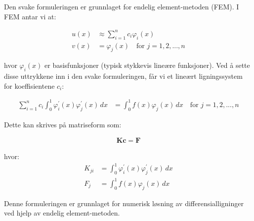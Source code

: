 Den svake formuleringen er grunnlaget for endelig element-metoden (FEM).
I FEM antar vi at:

\begin{align*}
    u(x) & \approx \sum_{i=1}^n c_i \varphi_i(x)        \\
    v(x) & = \varphi_j(x) \quad \text{for } j=1,2,...,n
\end{align*}

hvor $\varphi_i(x)$ er basisfunksjoner (typisk stykkevis lineære funksjoner). Ved å sette disse uttrykkene inn i den svake formuleringen, får vi et lineært ligningssystem for koeffisientene $c_i$:

\begin{align*}
    \sum_{i=1}^n c_i \int_0^1 \varphi_i^{\prime}(x) \varphi_j^{\prime}(x) \, dx & = \int_0^1 f(x) \varphi_j(x) \, dx \quad \text{for } j=1,2,...,n
\end{align*}

Dette kan skrives på matriseform som:

\begin{align*}
    \mathbf{K} \mathbf{c} = \mathbf{F}
\end{align*}

hvor:
\begin{align*}
    K_{ji} & = \int_0^1 \varphi_i^{\prime}(x) \varphi_j^{\prime}(x) \, dx \\
    F_j    & = \int_0^1 f(x) \varphi_j(x) \, dx
\end{align*}

Denne formuleringen er grunnlaget for numerisk løsning av differensialligninger ved hjelp av endelig element-metoden.

